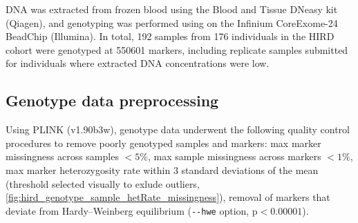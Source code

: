 DNA was extracted from frozen blood using the Blood and Tissue DNeasy kit (Qiagen), and genotyping was performed using on the Infinium CoreExome-24 BeadChip (Illumina).
In total, 192 samples from 176 individuals in the HIRD cohort were genotyped at 550601 markers, including replicate samples submitted for individuals where extracted DNA concentrations were low.

\subsection{Genotype data preprocessing}
\label{subsec:hird_dge_genotype_preproc}

Using PLINK (v1.90b3w), genotype data underwent the following quality control procedures to remove poorly genotyped samples and markers:
max marker missingness across samples $< 5\%$, 
max sample missingness across markers $< 1\%$, 
max marker heterozygosity rate within 3 standard deviations of the mean (threshold selected visually to exlude outliers, \autoref{fig:hird_genotype_sample_hetRate_missingness}),
removal of markers that deviate from Hardy–Weinberg equilibrium (\texttt{-{}-hwe} option, $\text{p} < 0.00001$).
  

